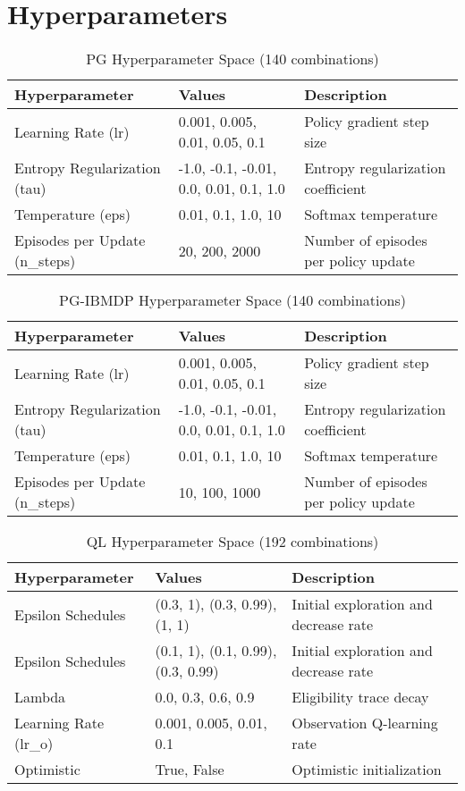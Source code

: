 \section{Hyperparameters}\label{sec:hp-pomdp}
\begin{table}
\small
\centering
\caption{PG Hyperparameter Space (140 combinations)}
\begin{tabular}{lll}
\toprule
\textbf{Hyperparameter} & \textbf{Values} & \textbf{Description} \\
\midrule
Learning Rate (lr) & 0.001, 0.005, 0.01, 0.05, 0.1 & Policy gradient step size \\
Entropy Regularization (tau) & -1.0, -0.1, -0.01, 0.0, 0.01, 0.1, 1.0 & Entropy regularization coefficient \\
Temperature (eps) & 0.01, 0.1, 1.0, 10 & Softmax temperature \\
Episodes per Update (n\_steps) & 20, 200, 2000 & Number of episodes per policy update \\
\bottomrule
\end{tabular}
\end{table}

\begin{table}
\small
\centering
\caption{PG-IBMDP Hyperparameter Space (140 combinations)}
\begin{tabular}{lll}
\toprule
\textbf{Hyperparameter} & \textbf{Values} & \textbf{Description} \\
\midrule
Learning Rate (lr) & 0.001, 0.005, 0.01, 0.05, 0.1 & Policy gradient step size \\
Entropy Regularization (tau) & -1.0, -0.1, -0.01, 0.0, 0.01, 0.1, 1.0 & Entropy regularization coefficient \\
Temperature (eps) & 0.01, 0.1, 1.0, 10 & Softmax temperature \\
Episodes per Update (n\_steps) & 10, 100, 1000 & Number of episodes per policy update \\
\bottomrule
\end{tabular}
\end{table}


\begin{table}
\small
\centering
\caption{QL Hyperparameter Space (192 combinations)}
\begin{tabular}{lll}
\toprule
\textbf{Hyperparameter} & \textbf{Values} & \textbf{Description} \\
\midrule
Epsilon Schedules & (0.3, 1), (0.3, 0.99), (1, 1) & Initial exploration and decrease rate \\
Epsilon Schedules & (0.1, 1), (0.1, 0.99), (0.3, 0.99) & Initial exploration and decrease rate \\
Lambda & 0.0, 0.3, 0.6, 0.9 & Eligibility trace decay \\
Learning Rate (lr\_o) & 0.001, 0.005, 0.01, 0.1 & Observation Q-learning rate \\
Optimistic & True, False & Optimistic initialization \\
\bottomrule
\end{tabular}
\end{table}


